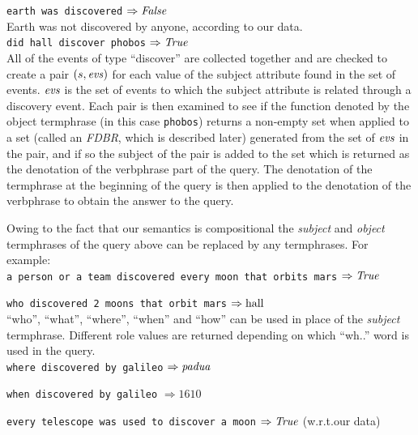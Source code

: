 \documentclass[../main.tex]{subfiles}
\begin{document}
\begin{refsection}
\noindent \texttt{earth was discovered} $\Rightarrow \operatorname{\mathit{False}}$ \\

Earth was not discovered by anyone, according to our data. \\

\noindent \texttt{did hall discover phobos} $\Rightarrow \operatorname{\mathit{True}}$ \\


All of the events of type ``discover'' are collected together and are checked to create a pair $(s, \operatorname{\mathit{evs}})$ for each value of the subject attribute found in the set of events. $\operatorname{\mathit{evs}}$ is the set of events to which the subject attribute is related through a discovery event.  Each pair is then examined to see if the function denoted by the object termphrase (in this case \texttt{phobos}) returns a non-empty set when applied to a set (called an \textit{FDBR}, which is described later) generated from the set of $\operatorname{\mathit{evs}}$ in the pair, and if so the subject of the pair is added to the set which is returned as the denotation of the verbphrase part of the query. The denotation of the termphrase at the beginning of the query is then applied to the denotation of the verbphrase to obtain the answer to the query. %

Owing to the fact that our semantics is compositional the \textit{subject} and \textit{object} termphrases of the query above can be replaced by any termphrases. For example: \\

\noindent \texttt{a person or a team  discovered every moon that orbits mars} $\Rightarrow \operatorname{\mathit{True}}$

\noindent \texttt{who discovered 2 moons that orbit mars} $\Rightarrow \operatorname{hall}$ \\

``who'', ``what'', ``where'', ``when'' and ``how'' can be used in place of the \textit{subject} termphrase. Different role values are returned depending on which ``wh..'' word is used in the query. \\

\noindent \texttt{where discovered by galileo} $\Rightarrow \operatorname{\mathit{padua}}$

\noindent \texttt{when discovered by galileo} $\Rightarrow 1610$

\noindent \texttt{every telescope was used to discover a moon} $\Rightarrow \operatorname{\mathit{True}}$ (w.r.t.our data)


\end{refsection}
\end{document}
